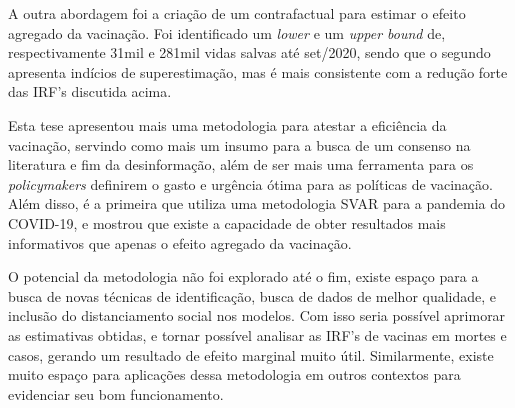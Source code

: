 \documentclass[
	12pt,				%
	oneside,			%
	a4paper,			%
	english,			%
	brazil				%
	hyperref = {colorlinks, citecolor=c1d, linkcolor=c2d, urlcolor=c3d, colorlinks}
	]{abntex2}
\begin{document}
A outra abordagem foi a criação de um contrafactual para estimar o efeito agregado da vacinação. Foi identificado um \textit{lower} e um \textit{upper bound} de, respectivamente 31mil e 281mil vidas salvas até set/2020, sendo que o segundo apresenta indícios de superestimação, mas é mais consistente com a redução forte das IRF's discutida acima.

Esta tese apresentou mais uma metodologia para atestar a eficiência da vacinação, servindo como mais um insumo para a busca de um consenso na literatura e fim da desinformação, além de ser mais uma ferramenta para os \textit{policymakers} definirem o gasto e urgência ótima para as políticas de vacinação. Além disso, é a primeira que utiliza uma metodologia SVAR para a pandemia do COVID-19, e mostrou que existe a capacidade de obter resultados mais informativos que apenas o efeito agregado da vacinação.

O potencial da metodologia não foi explorado até o fim, existe espaço para a busca de novas técnicas de identificação, busca de dados de melhor qualidade, e inclusão do distanciamento social nos modelos. Com isso seria possível aprimorar as estimativas obtidas, e tornar possível analisar as IRF's de vacinas em mortes e casos, gerando um resultado de efeito marginal muito útil. Similarmente, existe muito espaço para aplicações dessa metodologia em outros contextos para evidenciar seu bom funcionamento.



\postextual

\newpage
\printbibliography
\end{document}
